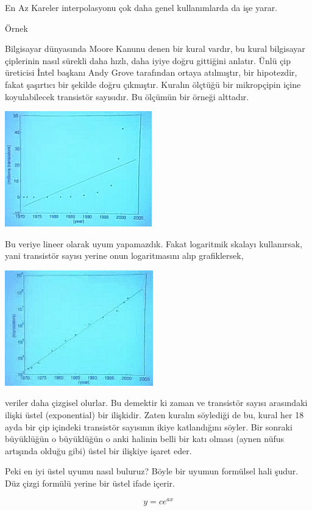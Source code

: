\documentclass[12pt,fleqn]{article}\usepackage{../../common}
\begin{document}
En Az Kareler interpolasyonu çok daha genel kullanımlarda da işe yarar. 

Örnek

Bilgisayar dünyasında Moore Kanunu denen bir kural vardır, bu kural bilgisayar
çiplerinin nasıl sürekli daha hızlı, daha iyiye doğru gittiğini anlatır. Ünlü
çip üreticisi İntel başkanı Andy Grove tarafından ortaya atılmıştır, bir
hipotezdir, fakat şaşırtıcı bir şekilde doğru çıkmıştır. Kuralın ölçtüğü bir
mikropçipin içine koyulabilecek transistör sayısıdır. Bu ölçümün bir örneği
alttadır.

\includegraphics[height=5cm]{9_7.png}

Bu veriye lineer olarak uyum yapamazdık. Fakat logaritmik skalayı kullanırsak,
yani transistör sayısı yerine onun logaritmasını alıp grafiklersek,

\includegraphics[height=5cm]{9_8.png}

veriler daha çizgisel olurlar. Bu demektir ki zaman ve transistör sayısı
arasındaki ilişki üstel (exponential) bir ilişkidir. Zaten kuralın söylediği de
bu, kural her 18 ayda bir çip içindeki transistör sayısının ikiye katlandığını
söyler. Bir sonraki büyüklüğün o büyüklüğün o anki halinin belli bir katı olması
(aynen nüfus artışında olduğu gibi) üstel bir ilişkiye işaret eder.

Peki en iyi üstel uyumu nasıl buluruz? Böyle bir uyumun formülsel hali
şudur. Düz çizgi formülü yerine bir üstel ifade içerir. 

$$ y = ce^{ax} $$
\end{document}
